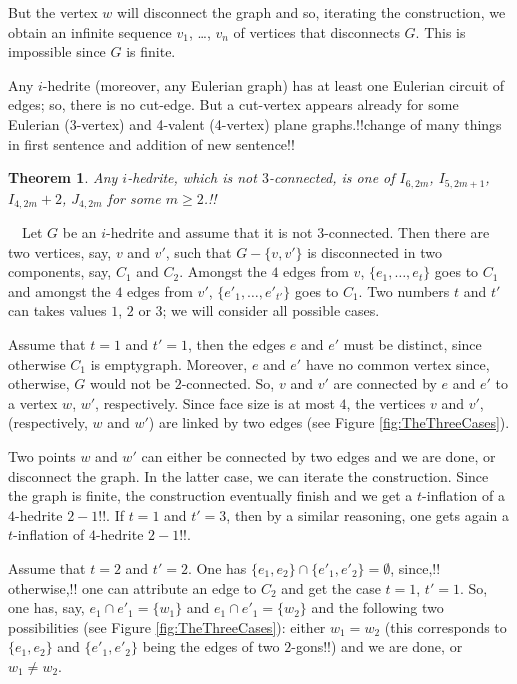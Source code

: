 \documentclass[12pt]{article}
\newtheorem{theor}{Theorem}
\newcommand{\proof}{\noindent{\bf Proof.}\ \ }
\begin{document}
But the vertex $w$ will disconnect the graph and so, iterating the construction, we obtain an infinite sequence $v_1$, \dots, $v_n$ of vertices that disconnects $G$. 
This is impossible since $G$ is finite.


Any $i$-hedrite (moreover, any Eulerian graph) has at least one 
Eulerian circuit of edges; so, there is no cut-edge.
But a cut-vertex appears already for some Eulerian (3-vertex)
and 4-valent (4-vertex) plane graphs.!!change
of many things in first sentence and addition of new sentence!!


\begin{theor}\label{3-connectedness}
Any $i$-hedrite, which is not $3$-connected, is one of 
$I_{6,2m}$,  $I_{5,2m+1}$,  $I_{4,2m}+2$, $J_{4,2m}$ for 
some $m\geq 2$.!!




\end{theor}

\proof Let $G$ be an $i$-hedrite and assume that it is not $3$-connected. 
Then there are two vertices, say, $v$ and $v'$, such that 
$G-\{v, v'\}$ is disconnected in two components, say, $C_1$ and $C_2$.
Amongst the $4$ edges from $v$, $\{e_1,\dots, e_{t}\}$ goes to $C_1$ and
amongst the $4$ edges from $v'$, $\{e'_1,\dots, e'_{t'}\}$ goes to $C_1$.
Two numbers $t$ and $t'$ can takes values $1$, $2$ or $3$; we
will consider all possible cases.

Assume that $t=1$ and $t'=1$, then the edges $e$ and $e'$ must be
distinct, since otherwise $C_1$ is emptygraph. Moreover, $e$ and $e'$ have
no common vertex since, otherwise, $G$ would not be $2$-connected.
So, $v$ and $v'$ are connected by $e$ and $e'$ to a vertex $w$, $w'$,
respectively. Since face size is at most $4$, the vertices $v$ and $v'$,
(respectively, $w$ and $w'$) are linked by two edges
(see Figure \ref{fig:TheThreeCases}).

Two points $w$ and $w'$ can either be connected by two edges and
we are done, or disconnect the graph. In the latter case, we can iterate
the construction. Since the graph is finite, the construction eventually
finish and we get a $t$-inflation of a $4$-hedrite $2-1!!$. If $t=1$ and
$t'=3$, then by a similar reasoning, one gets again a $t$-inflation of
$4$-hedrite $2-1!!$.

Assume that $t=2$ and $t'=2$. One has $\{e_1, e_2\}\cap \{e'_1, e'_2\}=\emptyset$, since,!! otherwise,!! one can attribute an edge to $C_2$ and get the case
$t=1$, $t'=1$. So, one has, say, $e_1\cap e'_1=\{w_1\}$ and 
$e_1\cap e'_1=\{w_2\}$ and the following two possibilities 
(see Figure \ref{fig:TheThreeCases}): either $w_1=w_2$ (this
corresponds to $\{e_1, e_2\}$ and $\{e'_1, e'_2\}$ being the edges
of two $2$-gons!!) and we are done, or $w_1\not= w_2$.
\end{document}
